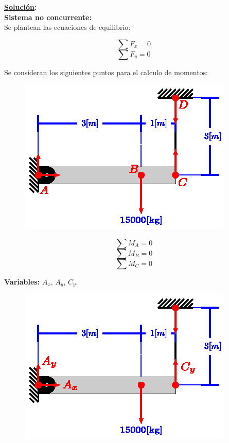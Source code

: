 \documentclass[letter,10pt,twoside]{article}
\begin{document}
\textbf{\underline{Solución}:} \\

\textbf{Sistema no concurrente:} \\
Se plantean las ecuaciones de equilibrio:

\begin{equation*}
    \sum{F_x} = 0
\end{equation*}
\begin{equation*}
    \sum{F_y} = 0
\end{equation*}

Se consideran los siguientes puntos para el calculo de momentos:

\begin{figure}[H]
\centering
\includegraphics[scale=1.8]{resources/g01.eps}
\end{figure}

\begin{equation*}
    \sum{M_A} = 0
\end{equation*}
\begin{equation*}
    \sum{M_B} = 0
\end{equation*}
\begin{equation*}
    \sum{M_C} = 0
\end{equation*}

\textbf{Variables:} $A_x$, $A_y$, $C_y$.
\\

\begin{figure}[H]
\centering
\includegraphics[scale=1.8]{resources/h01.eps}
\end{figure}
\end{document}
